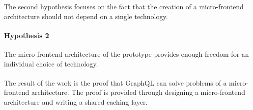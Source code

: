 The second hypothesis focuses on the fact that the creation of a micro-frontend architecture should not depend on a single technology.

\paragraph{Hypothesis 2}
The micro-frontend architecture of the prototype provides enough freedom for an individual choice of technology.\\\\

The result of the work is the proof that GraphQL can solve problems of a micro-frontend architecture. The proof is provided through designing a micro-frontend architecture and writing a shared caching layer.
